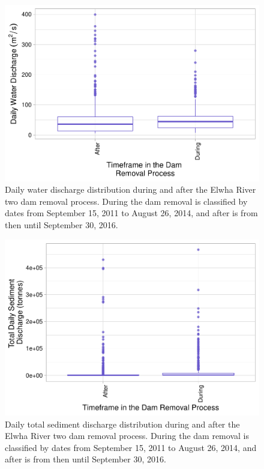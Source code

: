 \documentclass[12pt,]{article}
\begin{document}
\begin{figure}
\centering
\includegraphics{Mason_ENV872_ProjectFinal_files/figure-latex/Two Way T-Test REsults Water (Figure 10)-1.pdf}
\caption{Daily water discharge distribution during and after the Elwha
River two dam removal process. During the dam removal is classified by
dates from September 15, 2011 to August 26, 2014, and after is from then
until September 30, 2016.}
\end{figure}

\begin{figure}
\centering
\includegraphics{Mason_ENV872_ProjectFinal_files/figure-latex/Two Way T-Test REsults sediment(Figure 11)-1.pdf}
\caption{Daily total sediment discharge distribution during and after
the Elwha River two dam removal process. During the dam removal is
classified by dates from September 15, 2011 to August 26, 2014, and
after is from then until September 30, 2016.}
\end{figure}
\end{document}
